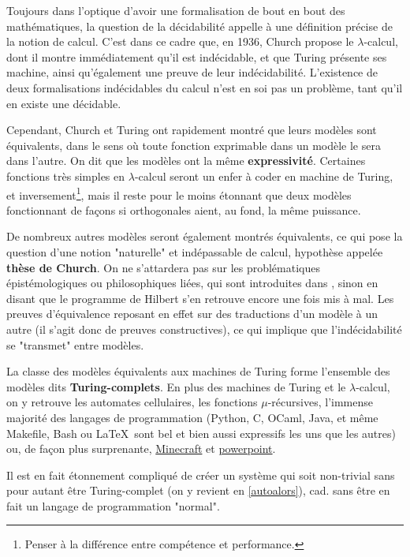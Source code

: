 Toujours dans l'optique d'avoir une formalisation de bout en bout des mathématiques, la question de la décidabilité appelle à une définition précise de la notion de calcul. C'est dans ce cadre que, en 1936, Church propose le $\lambda$-calcul, dont il montre immédiatement qu'il est indécidable, et que Turing présente ses machine, ainsi qu'également une preuve de leur indécidabilité. L'existence de deux formalisations indécidables du calcul n'est en soi pas un problème, tant qu'il en existe une décidable. 

Cependant, Church et Turing ont rapidement montré que leurs modèles sont équivalents, dans le sens où toute fonction exprimable dans un modèle le sera dans l'autre. On dit que les modèles ont la même \textbf{expressivité}. Certaines fonctions très simples en $\lambda$-calcul seront un enfer à coder en machine de Turing, et inversement\footnote{Penser à la différence entre compétence et performance.}, mais il reste pour le moins étonnant que deux modèles fonctionnant de façons si orthogonales aient, au fond, la même puissance. 

De nombreux autres modèles seront également montrés équivalents, ce qui pose la question d'une notion "naturelle" et indépassable de calcul, hypothèse appelée \textbf{thèse de Church}. On ne s'attardera pas sur les problématiques épistémologiques ou philosophiques liées, qui sont introduites dans \cite{dowek}, sinon en disant que le programme de Hilbert s'en retrouve encore une fois mis à mal. Les preuves d'équivalence reposant en effet sur des traductions d'un modèle à un autre (il s'agit donc de preuves constructives), ce qui implique que l'indécidabilité se "transmet" entre modèles.

La classe des modèles équivalents aux machines de Turing forme l'ensemble des modèles dits \textbf{Turing-complets}. En plus des machines de Turing et le $\lambda$-calcul, on y retrouve les automates cellulaires, les fonctions $\mu$-récursives, l'immense majorité des langages de programmation (Python, C, OCaml, Java, et même Makefile, Bash ou \LaTeX~sont bel et bien aussi expressifs les uns que les autres) ou, de façon plus surprenante, \href{https://gaming.stackexchange.com/questions/20219/is-minecraft-turing-complete}{Minecraft} et \href{https://www.youtube.com/watch?v=uNjxe8ShM-8}{powerpoint}.

Il est en fait étonnement compliqué de créer un système qui soit non-trivial sans pour autant être Turing-complet (on y revient en \ref{autoalors}), cad. sans être en fait un langage de programmation "normal".

